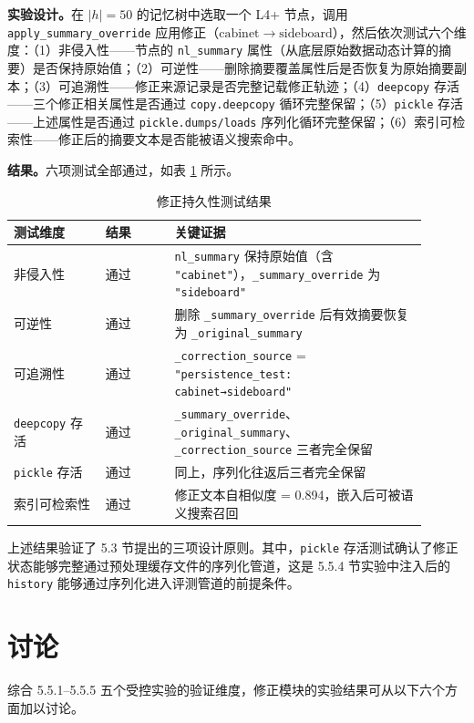 \textbf{实验设计。}在 $|h|=50$ 的记忆树中选取一个 L4+ 节点，调用 \texttt{apply\_summary\_override} 应用修正（$\mathrm{cabinet} \rightarrow \mathrm{sideboard}$），然后依次测试六个维度：（1）非侵入性——节点的 \texttt{nl\_summary} 属性（从底层原始数据动态计算的摘要）是否保持原始值；（2）可逆性——删除摘要覆盖属性后是否恢复为原始摘要副本；（3）可追溯性——修正来源记录是否完整记载修正轨迹；（4）\texttt{deepcopy} 存活——三个修正相关属性是否通过 \texttt{copy.deepcopy} 循环完整保留；（5）\texttt{pickle} 存活——上述属性是否通过 \texttt{pickle.dumps/loads} 序列化循环完整保留；（6）索引可检索性——修正后的摘要文本是否能被语义搜索命中。

\textbf{结果。}六项测试全部通过，如表 \ref{tab:5-5} 所示。

\begin{table}[htbp]
\centering
\small
\caption{修正持久性测试结果}
\label{tab:5-5}
\begin{tabular}{p{0.20\linewidth} p{0.15\linewidth} p{0.55\linewidth}}
\toprule
测试维度 & 结果 & 关键证据 \\
\midrule
非侵入性 & 通过 & \texttt{nl\_summary} 保持原始值（含 \texttt{"cabinet"}），\texttt{\_summary\_override} 为 \texttt{"sideboard"} \\
可逆性 & 通过 & 删除 \texttt{\_summary\_override} 后有效摘要恢复为 \texttt{\_original\_summary} \\
可追溯性 & 通过 & \texttt{\_correction\_source} = \texttt{"persistence\_test: cabinet→sideboard"} \\
\texttt{deepcopy} 存活 & 通过 & \texttt{\_summary\_override}、\texttt{\_original\_summary}、\texttt{\_correction\_source} 三者完全保留 \\
\texttt{pickle} 存活 & 通过 & 同上，序列化往返后三者完全保留 \\
索引可检索性 & 通过 & 修正文本自相似度 = 0.894，嵌入后可被语义搜索召回 \\
\bottomrule
\end{tabular}
\end{table}

上述结果验证了 5.3 节提出的三项设计原则。其中，\texttt{pickle} 存活测试确认了修正状态能够完整通过预处理缓存文件的序列化管道，这是 5.5.4 节实验中注入后的 \texttt{history} 能够通过序列化进入评测管道的前提条件。

\section{讨论}

综合 5.5.1–5.5.5 五个受控实验的验证维度，修正模块的实验结果可从以下六个方面加以讨论。

